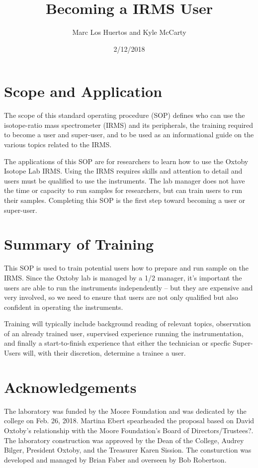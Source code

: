 \documentclass[12pt]{../SOP3_beta}\usepackage[]{graphicx}\usepackage[]{color}
\title{Becoming a IRMS User}
\date{2/12/2018}
\author{Marc Los Huertos and Kyle McCarty}
\begin{document}
\maketitle

\section{Scope and Application}

\NP The scope of this standard operating procedure (SOP) defines who can use the isotope-ratio mass spectrometer (IRMS) and its peripherals, the training required to become a user and super-user, and to be used as an informational guide on the various topics related to the IRMS.

\NP The applications of this SOP are for researchers to learn how to use the Oxtoby Isotope Lab IRMS. Using the IRMS requires skills and attention to detail and users must be qualified to use the instruments. The lab manager does not have the time or capacity to run samples for researchers, but can train users to run their samples. Completing this SOP is the first step toward becoming a user or super-user.

\section{Summary of Training}

\NP This SOP is used to train potential users how to prepare and run sample on the IRMS. Since the Oxtoby lab is managed by a 1/2 manager, it's important the users are able to run the instruments independently -- but they are expensive and very involved, so we need to ensure that users are not only qualified but also confident in operating the instruments.

\NP Training will typically include background reading of relevant topics, observation of an already trained user, supervised experience running the instrumentation, and finally a start-to-finish experience that either the technician or specfic Super-Users will, with their discretion, determine a trainee a user.

\newpage

\tableofcontents


\newpage
\section{Acknowledgements}

The laboratory was funded by the Moore Foundation and was dedicated by the college on Feb. 26, 2018. Martina Ebert spearheaded the proposal based on David Oxtoby's relationship with the Moore Foundation's Board of Directors/Trustees?. The laboratory construction was approved by the Dean of the College, Audrey Bilger, President Oxtoby, and the Treasurer Karen Sission. The consturction was developed and managed by Brian Faber and overseen by Bob Robertson.
\end{document}
